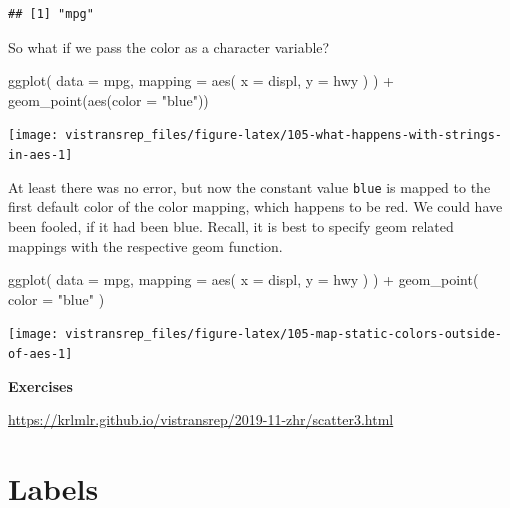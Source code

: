 \documentclass[]{book}
\newenvironment{Shaded}{}{}
\newcommand{\DataTypeTok}[1]{#1}
\newcommand{\KeywordTok}[1]{\textcolor[rgb]{0.00,0.00,1.00}{#1}}
\newcommand{\NormalTok}[1]{#1}
\newcommand{\OperatorTok}[1]{#1}
\newcommand{\StringTok}[1]{\textcolor[rgb]{0.00,0.50,0.50}{#1}}
\begin{document}
\begin{verbatim}
## [1] "mpg"
\end{verbatim}

So what if we pass the color as a character variable?

\begin{Shaded}
\begin{Highlighting}[]
\KeywordTok{ggplot}\NormalTok{(}
  \DataTypeTok{data =}\NormalTok{ mpg,}
  \DataTypeTok{mapping =} \KeywordTok{aes}\NormalTok{(}
    \DataTypeTok{x =}\NormalTok{ displ,}
    \DataTypeTok{y =}\NormalTok{ hwy}
\NormalTok{  )}
\NormalTok{) }\OperatorTok{+}
\StringTok{  }\KeywordTok{geom_point}\NormalTok{(}\KeywordTok{aes}\NormalTok{(}\DataTypeTok{color =} \StringTok{"blue"}\NormalTok{))}
\end{Highlighting}
\end{Shaded}

\begin{flushright}\texttt{[image: vistransrep\_files/figure-latex/105-what-happens-with-strings-in-aes-1]} \end{flushright}

At least there was no error, but now the constant value \texttt{blue} is mapped to the first default color of the color mapping, which happens to be red.
We could have been fooled, if it had been blue.
Recall, it is best to specify geom related mappings with the respective geom function.

\begin{Shaded}
\begin{Highlighting}[]
\KeywordTok{ggplot}\NormalTok{(}
  \DataTypeTok{data =}\NormalTok{ mpg,}
  \DataTypeTok{mapping =} \KeywordTok{aes}\NormalTok{(}
    \DataTypeTok{x =}\NormalTok{ displ,}
    \DataTypeTok{y =}\NormalTok{ hwy}
\NormalTok{  )}
\NormalTok{) }\OperatorTok{+}
\StringTok{  }\KeywordTok{geom_point}\NormalTok{(}
    \DataTypeTok{color =} \StringTok{"blue"}
\NormalTok{  )}
\end{Highlighting}
\end{Shaded}

\begin{flushright}\texttt{[image: vistransrep\_files/figure-latex/105-map-static-colors-outside-of-aes-1]} \end{flushright}

\textbf{Exercises}

\url{https://krlmlr.github.io/vistransrep/2019-11-zhr/scatter3.html}

\hypertarget{labels}{%
\section{Labels}\label{labels}}
\end{document}

